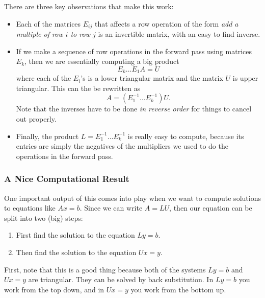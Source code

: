 \documentclass[10pt,]{book}
\theoremstyle{plain}
\numberwithin{equation}{section}
\begin{document}
      There are three key observations that make this work:
\begin{itemize}
\item{}
        Each of the matrices \(E_{ij}\) that affects a row operation of the
        form \emph{add a multiple of row \(i\) to row \(j\)} is an invertible
        matrix, with an easy to find inverse.
      \item{}
        If we make a sequence of row operations in the forward pass using
        matrices \(E_k\), then we are essentially computing a big product
        \[
        E_k \dots E_1 A = U
        \]
        where each of the \(E_i\)'s is a lower triangular matrix and the matrix
        \(U\) is upper triangular. This can the be rewritten as
        \[
        A = \left(E_1^{-1} \dots E_k^{-1} \right) U .
        \]
        Note that the inverses have to be done \emph{in reverse order} for things
        to cancel out properly.
      \item{}
        Finally, the product \(L = E_1^{-1} \dots E_k^{-1}\) is really easy to
        compute, because its entries are simply the negatives of the multipliers
        we used to do the operations in the forward pass.
      \end{itemize}
\typeout{************************************************}
\typeout{************************************************}
\subsubsection[A Nice Computational Result]{A Nice Computational Result}\label{subsubsection-24}

        One important output of this comes into play when we want to compute
        solutions to equations like \(Ax = b\). Since we can write \(A = LU\),
        then our equation can be split into two (big) steps:
        \begin{enumerate}
\item{} First find the solution to the equation \(Ly = b\).\item{} Then find the solution to the equation \(Ux = y\).\end{enumerate}

\par

        First, note that this is a good thing because both of the systems
        \(Ly = b\) and \(Ux = y\) are triangular. They can be solved by back
        substitution. In \(Ly = b\) you work from the top down, and in \(Ux=y\)
        you work from the bottom up.
\par
\end{document}
